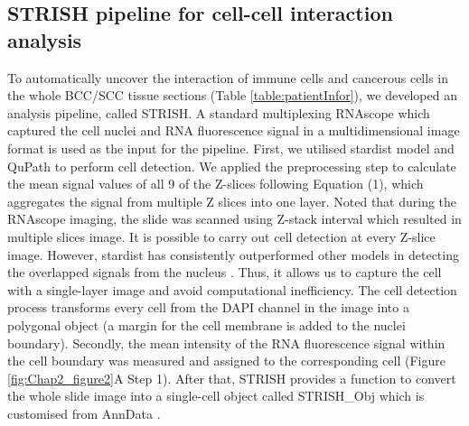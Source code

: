 \subsection{STRISH pipeline for cell-cell interaction analysis}
\label{Sec:2.3_validation} 
To automatically uncover the interaction of immune cells and cancerous cells in the whole BCC/SCC tissue sections (Table \ref{table:patientInfor}), we developed an analysis pipeline, called STRISH. A standard multiplexing RNAscope which captured the cell nuclei and RNA fluorescence signal in a multidimensional image format is used as the input for the pipeline. First, we utilised stardist \cite{schmidt2018cell} model and QuPath \cite{bankhead2017qupath} to perform cell detection. We applied the preprocessing step to calculate the mean signal values of all 9 of the Z-slices following Equation (1), which aggregates the signal from multiple Z slices into one layer. Noted that during the RNAscope imaging, the slide was scanned using Z-stack interval which resulted in multiple slices image. It is possible to carry out cell detection at every Z-slice image. However, stardist has consistently outperformed other models in detecting the overlapped signals from the nucleus \cite{schmidt2018cell}. Thus, it allows us to capture the cell with a single-layer image and avoid computational inefficiency. The cell detection process transforms every cell from the DAPI channel in the image into a polygonal object (a margin for the cell membrane is added to the nuclei boundary). Secondly, the mean intensity of the RNA fluorescence signal within the cell boundary was measured and assigned to the corresponding cell (Figure \ref{fig:Chap2_figure2}A Step 1). After that, STRISH provides a function to convert the whole slide image into a single-cell object called STRISH\_Obj which is customised from AnnData \cite{wolf2018scanpy}. 

